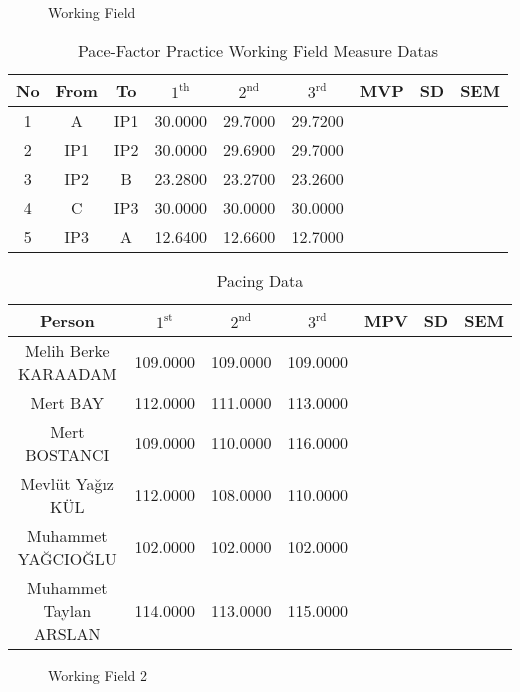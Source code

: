 \documentclass[12pt]{article}
\begin{document}
\begin{figure}[ht!]
    \centering
    
    \caption{Working Field}
\end{figure}

\begin{table}[ht!]
\centering
\begin{tabular}{ccccccccc}
\hline
No & From & To  & $1^{\operatorname{th}}$  & $2^{\operatorname{nd}}$  & $3^{\operatorname{rd}}$   & MVP & SD & SEM \\
\hline
1 & A & IP1 & 30.0000 & 29.7000 & 29.7200 &  &  &  \\
2 & IP1 & IP2 & 30.0000 & 29.6900 & 29.7000 &  &  &  \\
3 & IP2 & B & 23.2800 & 23.2700 & 23.2600 &  &  &   \\
4 & C & IP3 & 30.0000 & 30.0000 & 30.0000 &  &  &  \\
5 & IP3 & A & 12.6400 & 12.6600 & 12.7000 &  &  &  \\
\hline
\end{tabular}
\caption{Pace-Factor Practice Working Field Measure Datas} 
\end{table}


\begin{table}[ht!]
\centering
\begin{tabular}{ccccccc}
\hline
Person & $1^{\text{st}}$ & $2^{\text{nd}}$ & $3^{\text{rd}}$ & MPV & SD & SEM \\
\hline
Melih Berke KARAADAM & 109.0000 & 109.0000 & 109.0000 &  &  &  \\
Mert BAY & 112.0000 & 111.0000 & 113.0000 &  &  &  \\
Mert BOSTANCI & 109.0000 & 110.0000 & 116.0000 &  &  &  \\
Mevlüt Yağız KÜL & 112.0000 & 108.0000 & 110.0000 & &  &  \\
Muhammet YAĞCIOĞLU & 102.0000 & 102.0000 & 102.0000 & && \\
Muhammet Taylan ARSLAN & 114.0000 & 113.0000 & 115.0000 &&& \\
\hline
\end{tabular}
\caption{Pacing Data}
\end{table}

\newpage

\begin{figure}[ht!]
    \centering
    
    \caption{Working Field 2}
\end{figure}
\end{document}
